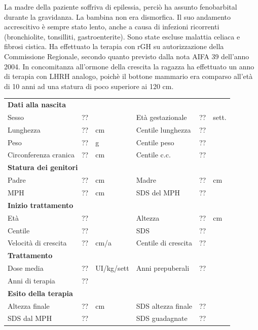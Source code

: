 La madre della paziente soffriva di epilessia, perciò ha assunto fenobarbital durante la gravidanza. La bambina non era dismorfica. Il suo andamento accrescitivo è sempre stato lento, anche a causa di infezioni ricorrenti (bronchiolite, tonsilliti, gastroenterite). Sono state escluse malattia celiaca e fibrosi cistica.  Ha effettuato la terapia con rGH su autorizzazione della Commissione Regionale, secondo quanto previsto dalla nota AIFA 39 dell'anno 2004. In concomitanza all'ormone della crescita la ragazza ha effettuato un anno di terapia con LHRH analogo, poichè il bottone mammario era comparso all'età di 10 anni ad una statura di poco superiore ai 120 cm.

\begin{table}[!h]
\begin{tabular}{lrllrl}
\toprule
\multicolumn{6}{l}{\textbf{Dati alla nascita}}\\
Sesso 		& \multicolumn{2}{l}{??} 	& Età gestazionale 		& ?? 		& sett.\\
Lunghezza 	& ?? 		& cm 				& Centile lunghezza		& ?? 		\\
Peso 		& ?? 		& g					& Centile peso			& ?? 		\\
Circonferenza cranica	& ?? 		& cm 	& Centile c.c.			& ?? \\
\midrule
\multicolumn{6}{l}{\textbf{Statura dei genitori}}\\
Padre 		& ?? & cm 	& Madre 				& ?? & cm \\
MPH 		& ?? & cm 	& SDS del MPH 			& ??\\
\midrule
\multicolumn{6}{l}{\textbf{Inizio trattamento}} \\
Età	& ?? & 		& Altezza 				& ?? & cm  \\
Centile & ?? 	 &		& SDS		& ?? \\
Velocità di crescita & ?? & cm/a	& Centile di crescita & ??\\
\midrule
\multicolumn{6}{l}{\textbf{Trattamento}} \\
Dose media		& ?? & UI/kg/sett & Anni prepuberali & ??\\
Anni di terapia & ??\\
\midrule
\multicolumn{6}{l}{\textbf{Esito della terapia}} \\
Altezza finale			& ?? & cm 	& SDS altezza finale		& ??\\
SDS dal MPH				& ?? &		& SDS guadagnate 			& ??\\
\bottomrule
\end{tabular}
\end{table}
\clearpage



